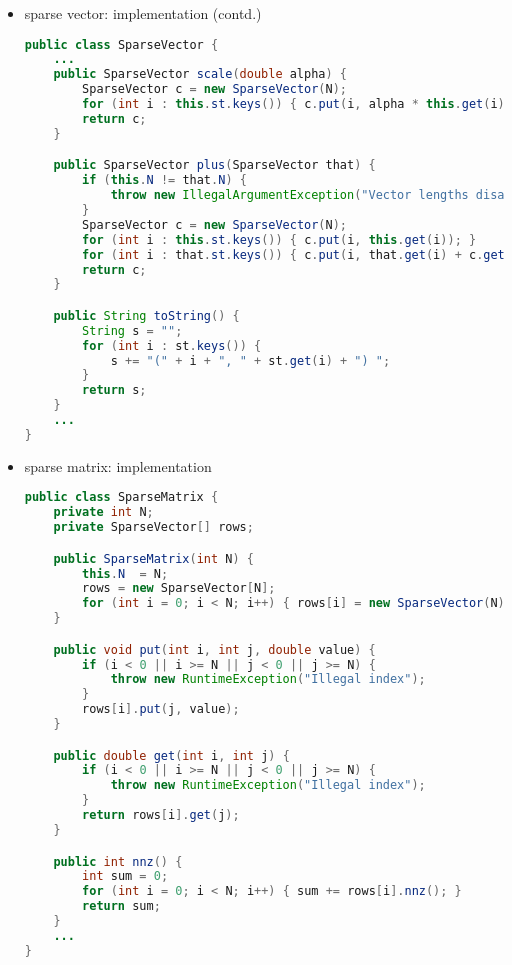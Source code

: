 \documentclass[8pt,a4paper,compress]{beamer}
\begin{document}
\begin{frame}[fragile]
\begin{itemize}
\item sparse vector: implementation (contd.)
\begin{lstlisting}[language=Java]
public class SparseVector {
    ...
    public SparseVector scale(double alpha) {
        SparseVector c = new SparseVector(N);
        for (int i : this.st.keys()) { c.put(i, alpha * this.get(i)); }
        return c;
    }

    public SparseVector plus(SparseVector that) {
        if (this.N != that.N) {
            throw new IllegalArgumentException("Vector lengths disagree"); 
        }
        SparseVector c = new SparseVector(N);
        for (int i : this.st.keys()) { c.put(i, this.get(i)); }
        for (int i : that.st.keys()) { c.put(i, that.get(i) + c.get(i)); } 
        return c;
    }

    public String toString() {
        String s = "";
        for (int i : st.keys()) {
            s += "(" + i + ", " + st.get(i) + ") ";
        }
        return s;
    }
    ...
}
\end{lstlisting}
\end{itemize}
\end{frame}

\begin{frame}[fragile]
\begin{itemize}
\item sparse matrix: implementation
\begin{lstlisting}[language=Java]
public class SparseMatrix {
    private int N; 
    private SparseVector[] rows; 

    public SparseMatrix(int N) {
        this.N  = N;
        rows = new SparseVector[N];
        for (int i = 0; i < N; i++) { rows[i] = new SparseVector(N); }
    }

    public void put(int i, int j, double value) {
        if (i < 0 || i >= N || j < 0 || j >= N) { 
            throw new RuntimeException("Illegal index"); 
        }
        rows[i].put(j, value);
    }

    public double get(int i, int j) {
        if (i < 0 || i >= N || j < 0 || j >= N) { 
            throw new RuntimeException("Illegal index"); 
        }
        return rows[i].get(j);
    }

    public int nnz() { 
        int sum = 0;
        for (int i = 0; i < N; i++) { sum += rows[i].nnz(); }
        return sum;
    }
    ...
}
\end{lstlisting}
\end{itemize}
\end{frame}
\end{document}

